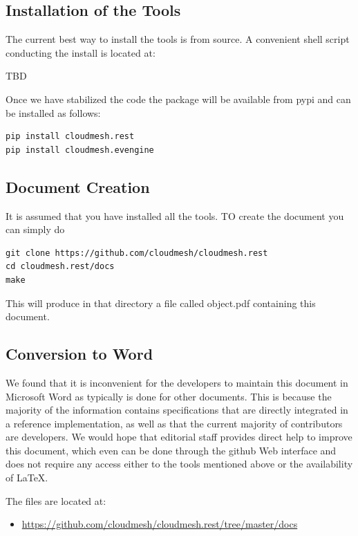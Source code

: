 \documentclass[10pt]{article}
\begin{document}
\subsection{Installation of the Tools}

The current best way to install the tools is from source. A convenient
shell script conducting the install is located at:

TBD

Once we have stabilized the code the package will be available from
pypi and can be installed as follows:

\begin{Verbatim}
pip install cloudmesh.rest
pip install cloudmesh.evengine
\end{Verbatim} 

\subsection{Document Creation}

It is assumed that you have installed all the tools. TO create the
document you can simply do

\begin{Verbatim}
git clone https://github.com/cloudmesh/cloudmesh.rest
cd cloudmesh.rest/docs
make
\end{Verbatim}

This will produce in that directory a file called object.pdf
containing this document.

\subsection{Conversion to Word}

We found that it is inconvenient for the developers to maintain this
document in Microsoft Word as typically is done for other
documents. This is because the majority of the information contains
specifications that are directly integrated in a reference
implementation, as well as that the current majority of contributors
are developers. We would hope that editorial staff provides direct
help to improve this document, which even can be done through the
github Web interface and does not require any access either to the
tools mentioned above or the availability of \LaTeX.

The files are located at:

\begin{itemize}
\item \url{https://github.com/cloudmesh/cloudmesh.rest/tree/master/docs}
\end{itemize}
\end{document}
